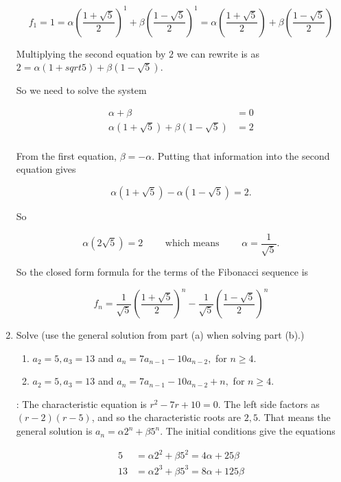 \documentclass[11pt]{amsart}
\begin{document}
\begin{enumerate}
\[
 f_1 = 1 = \alpha\left(\frac{1+\sqrt{5}}{2}\right)^1+\beta \left(\frac{1-\sqrt{5}}{2}\right)^1= \alpha\left(\frac{1+\sqrt{5}}{2}\right)+\beta \left(\frac{1-\sqrt{5}}{2}\right)
 \]


Multiplying the second equation by $2$ we can rewrite is as $2 = \alpha(1+sqrt{5}) + \beta(1-\sqrt{5})$.

So we need to solve the system 

\begin{align*}
\alpha + \beta & = 0\\[5pt]
\alpha(1+\sqrt{5}) + \beta(1-\sqrt{5}) &= 2\\
\end{align*}

From the first equation, $\beta = -\alpha$. Putting that information into the second equation gives

\[
\alpha(1+\sqrt{5}) -\alpha(1-\sqrt{5}) = 2.
\]

So

\[
\alpha(2\sqrt{5}) = 2\qquad \text{ which means }\qquad \alpha = \frac{1}{\sqrt{5}}.
\]

So the closed form formula for the terms of the Fibonacci sequence is 

\[
f_n = \frac{1}{\sqrt{5}}\left(\frac{1+\sqrt{5}}{2}\right)^n- 
\frac{1}{\sqrt{5}}\left( \frac{1-\sqrt{5}}{2}\right)^n
\]

\medskip

\item Solve (use the general solution from part (a) when solving part (b).)

\begin{enumerate}

\item $a_2=5, a_3=13$ and $a_n=7a_{n-1}-10a_{n-2},$ for $n\geq 4$.

\item $a_2=5, a_3=13$ and $a_n=7a_{n-1}-10a_{n-2}+n,$ for $n\geq 4$.

\end{enumerate}

: The characteristic equation is $r^2-7r+10=0$.
The left side factors as $(r-2)(r-5)$, and so the characteristic roots 
are $2, 5$. That means the general solution is $a_n = \alpha2^n +\beta5^n$.
The initial conditions give the equations


\begin{align*}
5 &= \alpha2^2 +\beta5^2 = 4\alpha+25\beta\\[5pt]
13&= \alpha2^3+\beta5^3 = 8\alpha+125\beta\\
\end{align*}


\end{enumerate}
\end{document}
